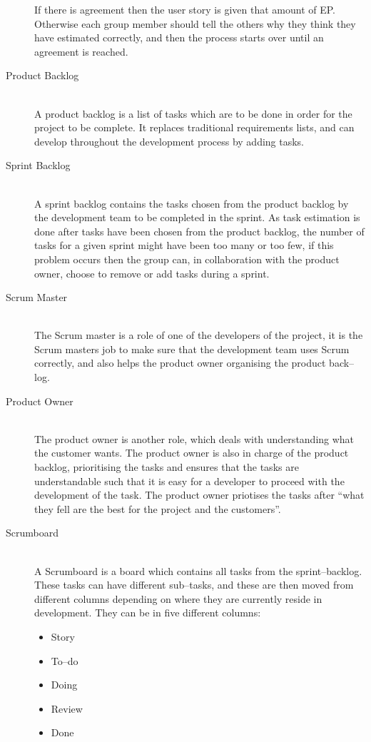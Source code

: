 \begin{description}
	If there is agreement then the user story is given that amount of EP.
	Otherwise each group member should tell the others why they think they have estimated correctly, and then the process starts over until an agreement is reached.
	\item[Product Backlog] \hfill \\
	A product backlog is a list of tasks which are to be done in order for the project to be complete.
	It replaces traditional requirements lists, and can develop throughout the development process by adding tasks.
	\item[Sprint Backlog] \hfill \\
	A sprint backlog contains the tasks chosen from the product backlog by the development team to be completed in the sprint.
	As task estimation is done after tasks have been chosen from the product backlog, the number of tasks for a given sprint might have been too many or too few, if this problem occurs then the group can, in collaboration with the product owner, choose to remove or add tasks during a sprint.
	\item[Scrum Master] \hfill \\
	The Scrum master is a role of one of the developers of the project, it is the Scrum masters job to make sure that the development team uses Scrum correctly, and also helps the product owner organising the product back--log.
	\item[Product Owner] \hfill \\
	The product owner is another role, which deals with understanding what the customer wants.
	The product owner is also in charge of the product backlog, prioritising the tasks and ensures that the tasks are understandable such that it is easy for a developer to proceed with the development of the task.
	The product owner priotises the tasks after \enquote{what they fell are the best for the project and the customers}.
	\item[Scrumboard] \hfill \\
	A Scrumboard is a board which contains all tasks from the sprint--backlog.
	These tasks can have different sub--tasks, and these are then moved from different columns depending on where they are currently reside in development.
	They can be in five different columns:
	\begin{multicols}{5}
		\begin{itemize}
		\item Story
		\item To--do
		\item Doing
		\item Review
		\item Done
	\end{itemize}
	\end{multicols}


\end{description}
